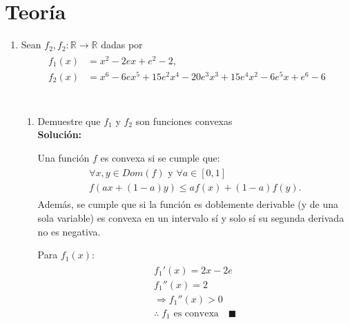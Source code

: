 \documentclass[10pt,letterpaper]{article}
\begin{document}
\section{Teoría}
    \begin{enumerate}
        \item Sean $f_2, f_2: \mathbb{R} \rightarrow \mathbb{R}$ dadas por
            \begin{equation*} \begin{split} \begin{aligned}
                f_1(x) &= x^2 - 2ex + e^2 - 2, \\
                f_2(x) &= x^6 - 6ex^5 + 15e^2x^4 - 20e^3x^3 + 15e^4x^2 - 6e^5x + e^6 - 6 \\
            \end{aligned} \end{split} \end{equation*} \\

            \begin{enumerate}
                \item Demuestre que $f_1$ y $f_2$ son funciones convexas \\

                    \textbf{Solución:}

                    Una función $f$ es convexa si se cumple que:
                    \begin{equation*} \begin{split} \begin{gathered}
                        \forall x, y \in Dom(f)  \text{ y } \forall a \in [0, 1] \\
                        f(ax + (1-a)y) \leq af(x) + (1 - a)f(y).
                    \end{gathered} \end{split} \end{equation*}
                    Además, se cumple que si la función es doblemente derivable
                    (y de una sola variable) es convexa en un intervalo sí y solo sí
                    su segunda derivada no es negativa.

                    Para $f_1(x)$:
                    \begin{equation*} \begin{split} \begin{gathered}
                        f_1'(x) = 2x - 2e \\
                        f_1''(x) = 2 \\
                        \Rightarrow f_1''(x) > 0 \\
                        \therefore \; f_1 \text{ es convexa} \quad \blacksquare
                    \end{gathered} \end{split} \end{equation*}


\end{enumerate}
\end{enumerate}
\end{document}
